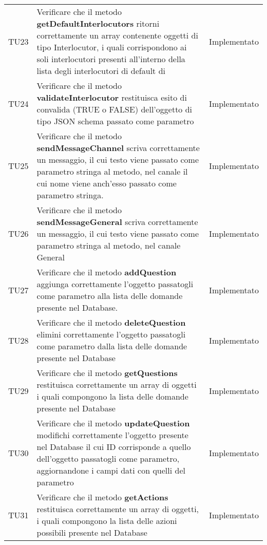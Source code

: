 \documentclass[../PianoDiQualifica_v3.0.0.tex]{subfiles}
\begin{document}
\begin{longtable}[c] { >{\centering\arraybackslash}p{2cm} p{9cm} >{\centering\arraybackslash}p{4cm}}
			\addlinespace[0.3em]
			\midrule
			\addlinespace[0.3em]
			TU23 & Verificare che il metodo \textbf{getDefaultInterlocutors} ritorni correttamente un array contenente oggetti di tipo Interlocutor, i quali corrispondono ai soli interlocutori presenti all'interno della lista degli interlocutori di default di \prop\ & Implementato \\
			\addlinespace[0.3em]
			\midrule
			\addlinespace[0.3em]
			TU24 & Verificare che il metodo \textbf{validateInterlocutor} restituisca esito di convalida (TRUE o FALSE) dell'oggetto di tipo JSON schema passato come parametro & Implementato \\
			\addlinespace[0.3em]
			\midrule
			\addlinespace[0.3em]
			TU25 & Verificare che il metodo \textbf{sendMessageChannel} scriva correttamente un messaggio, il cui testo viene passato come parametro stringa al metodo, nel canale il cui nome viene anch'esso passato come parametro stringa. & Implementato \\
			\addlinespace[0.3em]
			\midrule
			\addlinespace[0.3em]
			TU26 & Verificare che il metodo \textbf{sendMessageGeneral} scriva correttamente un messaggio, il cui testo viene passato come parametro stringa al metodo, nel canale General & Implementato \\
			\addlinespace[0.3em]
			\midrule
			\addlinespace[0.3em]
			TU27 & Verificare che il metodo \textbf{addQuestion} aggiunga correttamente l'oggetto passatogli come parametro alla lista delle domande presente nel Database. & Implementato \\
			\addlinespace[0.3em]
			\midrule
			\addlinespace[0.3em]
			TU28 & Verificare che il metodo \textbf{deleteQuestion} elimini correttamente l'oggetto passatogli come parametro dalla lista delle domande presente nel Database & Implementato \\
			\addlinespace[0.3em]
			\midrule
			\addlinespace[0.3em]
			TU29 & Verificare che il metodo \textbf{getQuestions} restituisca correttamente un array di oggetti i quali compongono la lista delle domande presente nel Database & Implementato \\
			\addlinespace[0.3em]
			\midrule
			\addlinespace[0.3em]
			TU30 & Verificare che il metodo \textbf{updateQuestion} modifichi correttamente l'oggetto presente nel Database il cui ID corrisponde a quello dell'oggetto passatogli come parametro, aggiornandone i campi dati con quelli del parametro & Implementato \\
			\addlinespace[0.3em]
			\midrule
			\addlinespace[0.3em]
			TU31 & Verificare che il metodo \textbf{getActions} restituisca correttamente un array di oggetti, i quali compongono la lista delle azioni possibili presente nel Database & Implementato \\

\end{longtable}
\end{document}
